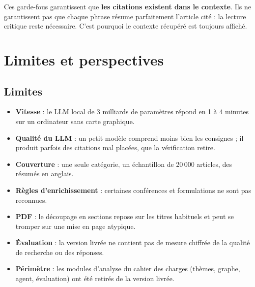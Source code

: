 \documentclass[11pt,a4paper]{article}
\begin{document}
\begin{attention}
Ces garde-fous garantissent que \textbf{les citations existent dans le contexte}. Ils ne
garantissent pas que chaque phrase résume parfaitement l'article cité : la lecture critique
reste nécessaire. C'est pourquoi le contexte récupéré est toujours affiché.
\end{attention}

\section{Limites et perspectives}

\subsection{Limites}
\begin{itemize}
  \item \textbf{Vitesse} : le LLM local de 3 milliards de paramètres répond en 1 à 4
  minutes sur un ordinateur sans carte graphique.
  \item \textbf{Qualité du LLM} : un petit modèle comprend moins bien les consignes ; il
  produit parfois des citations mal placées, que la vérification retire.
  \item \textbf{Couverture} : une seule catégorie, un échantillon de 20\,000 articles, des
  résumés en anglais.
  \item \textbf{Règles d'enrichissement} : certaines conférences et formulations ne sont
  pas reconnues.
  \item \textbf{PDF} : le découpage en sections repose sur les titres habituels et peut se
  tromper sur une mise en page atypique.
  \item \textbf{Évaluation} : la version livrée ne contient pas de mesure chiffrée de la
  qualité de recherche ou des réponses.
  \item \textbf{Périmètre} : les modules d'analyse du cahier des charges (thèmes, graphe,
  agent, évaluation) ont été retirés de la version livrée.
\end{itemize}
\end{document}

